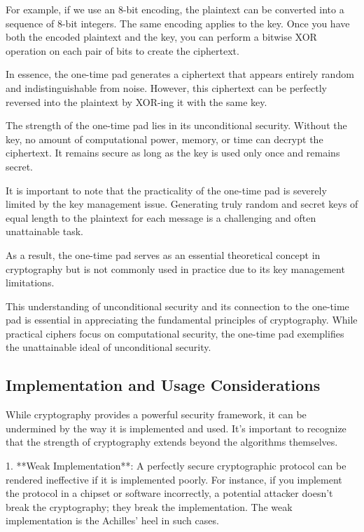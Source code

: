 \documentclass{class}
\begin{document}
For example, if we use an 8-bit encoding, the plaintext can be converted into a sequence of 8-bit integers. The same encoding applies to the key. Once you have both the encoded plaintext and the key, you can perform a bitwise XOR operation on each pair of bits to create the ciphertext.

In essence, the one-time pad generates a ciphertext that appears entirely random and indistinguishable from noise. However, this ciphertext can be perfectly reversed into the plaintext by XOR-ing it with the same key.

The strength of the one-time pad lies in its unconditional security. Without the key, no amount of computational power, memory, or time can decrypt the ciphertext. It remains secure as long as the key is used only once and remains secret.

It is important to note that the practicality of the one-time pad is severely limited by the key management issue. Generating truly random and secret keys of equal length to the plaintext for each message is a challenging and often unattainable task.

As a result, the one-time pad serves as an essential theoretical concept in cryptography but is not commonly used in practice due to its key management limitations.

This understanding of unconditional security and its connection to the one-time pad is essential in appreciating the fundamental principles of cryptography. While practical ciphers focus on computational security, the one-time pad exemplifies the unattainable ideal of unconditional security.


\subsection{Implementation and Usage Considerations}

While cryptography provides a powerful security framework, it can be undermined by the way it is implemented and used. It's important to recognize that the strength of cryptography extends beyond the algorithms themselves.

1. **Weak Implementation**: A perfectly secure cryptographic protocol can be rendered ineffective if it is implemented poorly. For instance, if you implement the protocol in a chipset or software incorrectly, a potential attacker doesn't break the cryptography; they break the implementation. The weak implementation is the Achilles' heel in such cases.
\end{document}
